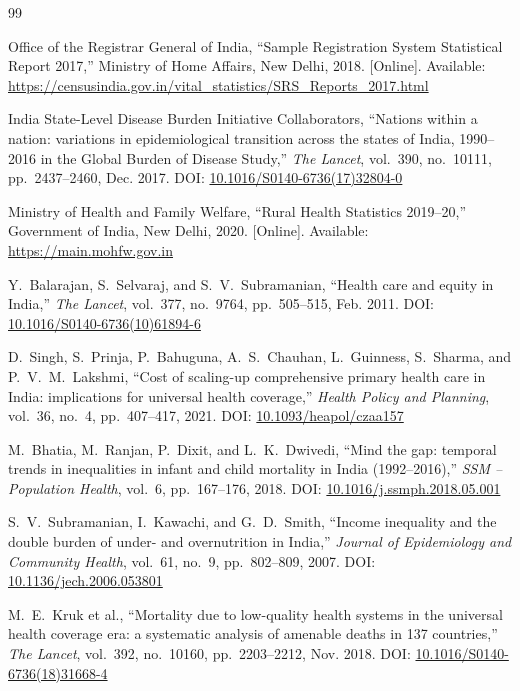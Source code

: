\documentclass[conference]{IEEEtran}
\begin{document}
\begin{thebibliography}{99}

Office of the Registrar General of India,
``Sample Registration System Statistical Report 2017,''
Ministry of Home Affairs, New Delhi, 2018.
[Online]. Available: \url{https://censusindia.gov.in/vital_statistics/SRS_Reports_2017.html}

India State-Level Disease Burden Initiative Collaborators,
``Nations within a nation: variations in epidemiological transition across the states of India, 1990--2016 in the Global Burden of Disease Study,''
\textit{The Lancet}, vol.~390, no.~10111, pp.~2437--2460, Dec. 2017.
DOI: \href{https://doi.org/10.1016/S0140-6736(17)32804-0}{10.1016/S0140-6736(17)32804-0}

Ministry of Health and Family Welfare,
``Rural Health Statistics 2019--20,''
Government of India, New Delhi, 2020.
[Online]. Available: \url{https://main.mohfw.gov.in}

Y.\ Balarajan, S.\ Selvaraj, and S.\ V.\ Subramanian,
``Health care and equity in India,''
\textit{The Lancet}, vol.~377, no.~9764, pp.~505--515, Feb. 2011.
DOI: \href{https://doi.org/10.1016/S0140-6736(10)61894-6}{10.1016/S0140-6736(10)61894-6}

D.\ Singh, S.\ Prinja, P.\ Bahuguna, A.~S.\ Chauhan, L.\ Guinness,
S.\ Sharma, and P.~V.~M.\ Lakshmi,
``Cost of scaling-up comprehensive primary health care in India: implications for universal health coverage,''
\textit{Health Policy and Planning}, vol.~36, no.~4, pp.~407--417, 2021.
DOI: \href{https://doi.org/10.1093/heapol/czaa157}{10.1093/heapol/czaa157}

M.\ Bhatia, M.\ Ranjan, P.\ Dixit, and L.~K.\ Dwivedi,
``Mind the gap: temporal trends in inequalities in infant and child mortality in India (1992--2016),''
\textit{SSM -- Population Health}, vol.~6, pp.~167--176, 2018.
DOI: \href{https://doi.org/10.1016/j.ssmph.2018.05.001}{10.1016/j.ssmph.2018.05.001}

S.~V.\ Subramanian, I.\ Kawachi, and G.~D.\ Smith,
``Income inequality and the double burden of under- and overnutrition in India,''
\textit{Journal of Epidemiology and Community Health}, vol.~61, no.~9,
pp.~802--809, 2007.
DOI: \href{https://doi.org/10.1136/jech.2006.053801}{10.1136/jech.2006.053801}

M.~E.\ Kruk et al.,
``Mortality due to low-quality health systems in the universal health coverage era: a systematic analysis of amenable deaths in 137 countries,''
\textit{The Lancet}, vol.~392, no.~10160, pp.~2203--2212, Nov. 2018.
DOI: \href{https://doi.org/10.1016/S0140-6736(18)31668-4}{10.1016/S0140-6736(18)31668-4}


\end{thebibliography}
\end{document}
